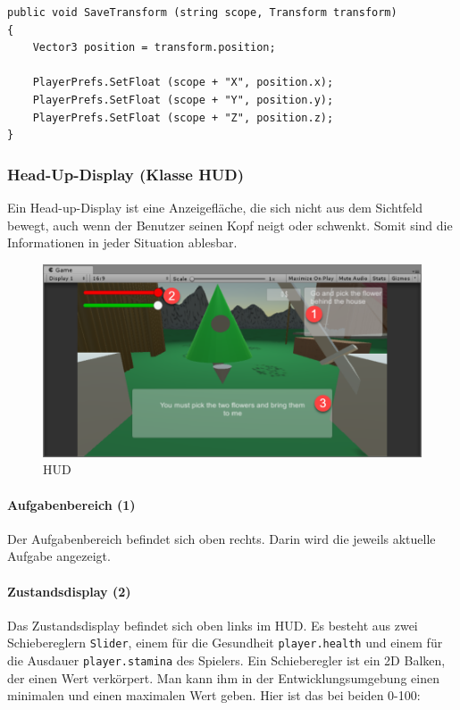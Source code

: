 \begin{lstlisting}[caption={Methode SaveTransform in GameData}]
public void SaveTransform (string scope, Transform transform)
{
	Vector3 position = transform.position;
	
	PlayerPrefs.SetFloat (scope + "X", position.x);
	PlayerPrefs.SetFloat (scope + "Y", position.y);
	PlayerPrefs.SetFloat (scope + "Z", position.z);
}
\end{lstlisting}

\subsubsection{Head-Up-Display (Klasse HUD)}
Ein Head-up-Display ist eine Anzeigefläche, die sich nicht aus dem Sichtfeld bewegt, auch wenn der Benutzer seinen Kopf neigt oder schwenkt.
Somit sind die Informationen in jeder Situation ablesbar.

\begin{figure}[H]
\includegraphics[scale=0.8]{screenshots/hud.png}
\caption{HUD}
\end{figure}

 
\paragraph{Aufgabenbereich (1)}
Der Aufgabenbereich befindet sich oben rechts.
Darin wird die jeweils aktuelle Aufgabe angezeigt.

\paragraph{Zustandsdisplay (2)}
Das Zustandsdisplay befindet sich oben links im HUD.
Es besteht aus zwei Schiebereglern \lstinline{Slider}, einem für die Gesundheit \lstinline{player.health} und einem für die Ausdauer \lstinline{player.stamina} des Spielers.
Ein Schieberegler ist ein 2D Balken, der einen Wert verkörpert. Man kann ihm in der Entwicklungsumgebung einen minimalen und einen maximalen Wert geben. Hier ist das bei beiden 0-100:

